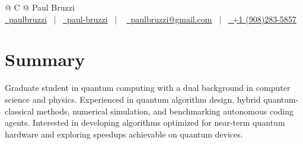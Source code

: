 \documentclass[a4paper,12pt]{article}
\begin{document}
\pagestyle{empty} 



\begin{tabularx}{\linewidth}{@{} C @{}}
\Huge{Paul Bruzzi} \\[7.5pt]
\href{https://github.com/paulbruzzi}{\raisebox{-0.05\height}\faGithub\ paulbruzzi} \ $|$ \ 
\href{https://linkedin.com/in/paul-bruzzi}{\raisebox{-0.05\height}\faLinkedin\ paul-bruzzi} \ $|$ \ 
\href{mailto:paulbruzzi@gmail.com}{\raisebox{-0.05\height}\faEnvelope \ paulbruzzi@gmail.com} \ $|$ \ 
\href{tel:+19082835857}{\raisebox{-0.05\height}\faMobile \ +1 (908)283-5857} \\
\end{tabularx}



\section{Summary}
Graduate student in quantum computing with a dual background in computer science and physics.
Experienced in quantum algorithm design, hybrid quantum-classical methods, numerical simulation,
and benchmarking autonomous coding agents. Interested in developing algorithms optimized for
near-term quantum hardware and exploring speedups achievable on quantum devices.

\end{document}
